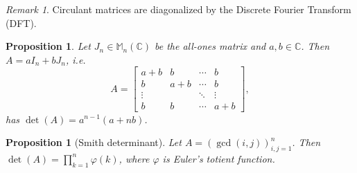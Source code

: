 \documentclass[12pt]{article}
\theoremstyle{breakplain}
\newtheorem{prop}[theorem]{Proposition}
\theoremstyle{breakdef}
\theoremstyle{remark}
\newtheorem*{remark}{Remark}
\begin{document}
\begin{remark}
    Circulant matrices are diagonalized by the Discrete Fourier Transform (DFT).
\end{remark}
\begin{prop}
    Let $J_n\in\mathbb{M}_n(\mathbb{C})$ be the all-ones matrix and $a,b \in \mathbb{C}$. Then $A=aI_n+bJ_n$, i.e.
    \[A=\begin{bmatrix}
        a+b & b & \cdots & b \\
        b & a+b & \cdots & b \\
        \vdots & & \ddots & \vdots \\
        b & b & \cdots & a+b
    \end{bmatrix},\]
    has $\det(A)=a^{n-1}(a+nb)$.
\end{prop}
\begin{prop}[Smith determinant]
    Let $A=(\gcd(i,j))_{i,j=1}^n$. Then $\det(A)=\prod_{k=1}^n \varphi(k)$, where $\varphi$ is Euler's totient function.
\end{prop}

\newpage
\end{document}
